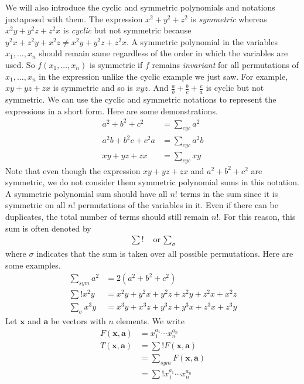 \documentclass{subfile}
\begin{document}
	We will also introduce the cyclic and symmetric polynomials and notations juxtaposed with them. The expression $x^{2}+y^{2}+z^{2}$ is \textit{symmetric} whereas $x^{2}y+y^{2}z+z^{2}x$ is \textit{cyclic} but not symmetric because $y^{2}x+z^{2}y+x^{2}z\neq x^{2}y+y^{2}z+z^{2}x$. A symmetric polynomial in the variables $x_{1},\ldots,x_{n}$ should remain same regardless of the order in which the variables are used. So $f(x_{1},\ldots,x_{n})$ is symmetric if $f$ remains \textit{invariant} for all permutations of $x_{1},\ldots,x_{n}$ in the expression unlike the cyclic example we just saw. For example, $xy+yz+zx$ is symmetric and so is $xyz$. And $\frac{a}{b}+\frac{b}{c}+\frac{c}{a}$ is cyclic but not symmetric. We can use the cyclic and symmetric notations to represent the expressions in a short form. Here are some demonstrations.
		\begin{align*}
			a^{2}+b^{2}+c^{2}
				& = \sum_{cyc}a^{2}\\
			a^{2}b+b^{2}c+c^{2}a
				& = \sum_{cyc}a^{2}b\\
			xy+yz+zx
				& = \sum_{cyc}xy
		\end{align*}
	Note that even though the expression $xy+yz+zx$ and $a^{2}+b^{2}+c^{2}$ are symmetric, we do not consider them symmetric polynomial sums in this notation. A symmetric polynomial sum should have all $n!$ terms in the sum since it is symmetric on all $n!$ permutations of the variables in it. Even if there can be duplicates, the total number of terms should still remain $n!$. For this reason, this sum is often denoted by
		\begin{align*}
			\sum{!}
				&\mbox{ or }\sum_{\sigma}
		\end{align*}
	where $\sigma$ indicates that the sum is taken over all possible permutations. Here are some examples.
		\begin{align*}
			\sum_{sym}a^{2}
				& = 2(a^{2}+b^{2}+c^{2})\\
			\sum{!} x^{2}y
				& = x^{2}y+y^{2}x+y^{2}z+z^{2}y+z^{2}x+x^{2}z\\
			\sum_{\sigma}x^{3}y
				& = x^{3}y+x^{3}z+y^{3}z+y^{3}x+z^{3}x+z^{3}y
		\end{align*}
	Let $\mathbf{x}$ and $\mathbf{a}$ be vectors with $n$ elements. We write
		\begin{align*}
			F(\mathbf{x}, \mathbf{a})
				& = x_{1}^{a_{1}}\cdots x_{n}^{a_{n}}\\
			T(\mathbf{x},\mathbf{a})
				& = \sum{!}F(\mathbf{x},\mathbf{a})\\
				& = \sum_{sym} F(\mathbf{x},\mathbf{a})\\
				& = \sum{!}x_{1}^{a_{1}}\cdots x_{n}^{a_{n}}
		\end{align*}
\end{document}
